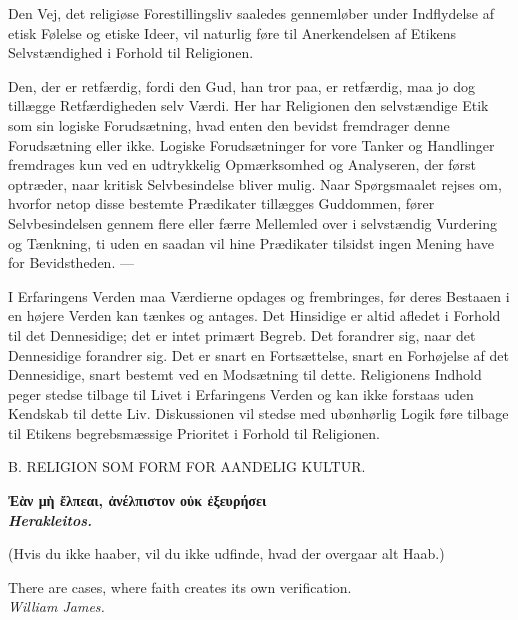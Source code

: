 \documentclass[12pt,a4paper,openany]{book}
\newcommand{\opage}[1]{\marginnote{\footnotesize\textit{[#1]}}}
\begin{document}
Den Vej, det religiøse Forestillingsliv saaledes gennemløber under
Indflydelse af etisk Følelse og etiske Ideer, vil naturlig føre til
Anerkendelsen af Etikens Selvstændighed i Forhold til Religionen.

Den, der er retfærdig, fordi den Gud, han tror paa, er retfærdig, maa jo
dog tillægge Retfærdigheden selv Værdi. Her har Religionen den
selvstændige Etik som sin logiske Forudsætning, hvad enten den bevidst
fremdrager denne Forudsætning eller ikke. Logiske Forudsætninger for
vore Tanker og Handlinger fremdrages kun ved en udtrykkelig Opmærksomhed
og Analyseren, der først optræder, naar kritisk Selvbesindelse bliver
mulig. Naar Spørgsmaalet rejses om, hvorfor netop disse bestemte
Prædikater tillægges Guddommen, fører Selvbesindelsen gennem flere eller
færre Mellemled over i selvstændig Vurdering og Tænkning, ti uden en
saadan vil hine Prædikater tilsidst ingen Mening have for Bevidstheden.
---

I Erfaringens Verden maa Værdierne opdages og frembringes, før deres
Bestaaen i en højere Verden kan tænkes og antages. Det Hinsidige er
altid afledet i Forhold til det Dennesidige; det
\opage{215}er intet primært Begreb. Det forandrer sig, naar det
Dennesidige forandrer sig. Det er snart en Fortsættelse, snart en
Forhøjelse af det Dennesidige, snart bestemt ved en Modsætning til
dette. Religionens Indhold peger stedse tilbage til Livet i Erfaringens
Verden og kan ikke forstaas uden Kendskab til dette Liv. Diskussionen
vil stedse med ubønhørlig Logik føre tilbage til Etikens begrebsmæssige
Prioritet i Forhold til Religionen.

\clearpage

\opage{216}\begin{center}B. RELIGION SOM FORM FOR AANDELIG KULTUR.\end{center}

\begin{flushright}\begin{minipage}{0.55\textwidth}\small\bfseries
Ἐὰν μὴ ἔλπεαι, ἀνέλπιστον οὐκ ἐξευρήσει\\
\hfill\textit{Herakleitos.}\par\smallskip
(Hvis du ikke haaber, vil du ikke udfinde, hvad der overgaar alt Haab.)\par\smallskip
There are cases, where faith creates its own verification.\\
\hfill\textit{William James.}
\end{minipage}\end{flushright}
\end{document}
